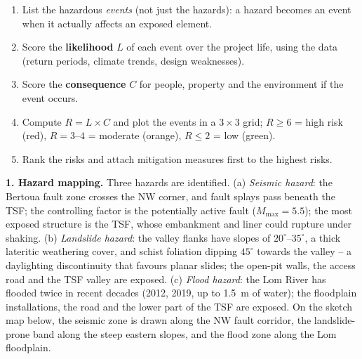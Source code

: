 \documentclass[11pt]{article}
\newcounter{popsec}
\newcounter{popsub}
\newcommand{\courssub}[1]{%
  \stepcounter{popsub}%
  \par\vspace{9pt}\noindent{\popxbold\fontsize{11.5}{13}\selectfont\color{popink}{\color{poporange}\thepopsec.\thepopsub}\hspace{6pt}#1}\par\nopagebreak\vspace{4pt}
}
\begin{document}
\begin{methode}
\begin{enumerate}
\item List the hazardous \emph{events} (not just the hazards): a hazard becomes an event when it actually affects an exposed element.
\item Score the \textbf{likelihood} $L$ of each event over the project life, using the data (return periods, climate trends, design weaknesses).
\item Score the \textbf{consequence} $C$ for people, property and the environment if the event occurs.
\item Compute $R = L \times C$ and plot the events in a $3 \times 3$ grid; $R \geq 6$ = high risk (red), $R = 3$--$4$ = moderate (orange), $R \leq 2$ = low (green).
\item Rank the risks and attach mitigation measures first to the highest risks.
\end{enumerate}
\end{methode}

\courssub{Model answer}

\textbf{1. Hazard mapping.} Three hazards are identified. (a) \emph{Seismic hazard}: the Bertoua fault zone crosses the NW corner, and fault splays pass beneath the TSF; the controlling factor is the potentially active fault ($M_{\max} = 5.5$); the most exposed structure is the TSF, whose embankment and liner could rupture under shaking. (b) \emph{Landslide hazard}: the valley flanks have slopes of $20^{\circ}$--$35^{\circ}$, a thick lateritic weathering cover, and schist foliation dipping $45^{\circ}$ towards the valley -- a daylighting discontinuity that favours planar slides; the open-pit walls, the access road and the TSF valley are exposed. (c) \emph{Flood hazard}: the Lom River has flooded twice in recent decades (2012, 2019, up to 1.5~m of water); the floodplain installations, the road and the lower part of the TSF are exposed. On the sketch map below, the seismic zone is drawn along the NW fault corridor, the landslide-prone band along the steep eastern slopes, and the flood zone along the Lom floodplain.
\end{document}
